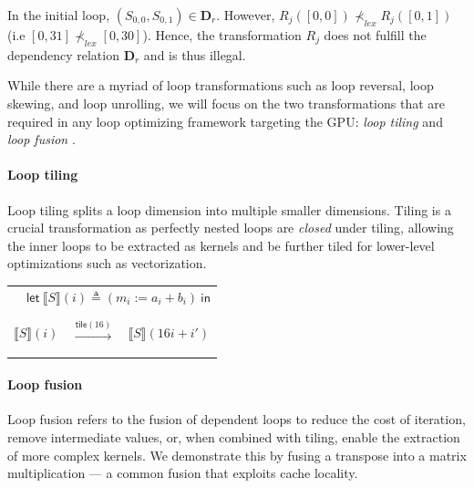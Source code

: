 \documentclass[review, acmsmall, nonacm]{acmart}
\begin{document}
In the initial loop, $(S_{0,0}, S_{0,1}) \in \mathbf{D}_r$. However, $R_j([0,0]) \not\prec_{lex} R_j([0,1])$ (i.e $[0,31] \not\prec_{lex} [0,30]$). Hence, the transformation $R_j$ does not fulfill the dependency relation $\mathbf{D}_r$ and is thus illegal.


While there are a myriad of loop transformations such as loop reversal, loop skewing, and loop unrolling, we will focus on the two transformations that are required in any loop optimizing framework targeting the GPU: \emph{loop tiling} \cite{xueTilingLoopTransformation2011,wonnacottScalabilityLoopTiling2013} and \emph{loop fusion} \cite{manjikianFusionLoopsParallelism1997, darteComplexityLoopFusion1999,qiaoLoopFusionKernel2019,mehtaRevisitingLoopFusion2014}. 

\paragraph{Loop tiling} Loop tiling splits a loop dimension into multiple smaller dimensions. Tiling is a crucial transformation as perfectly nested loops are \emph{closed} under tiling, allowing the inner loops to be extracted as kernels \cite{wonnacottScalabilityLoopTiling2013} and be further tiled for lower-level optimizations such as vectorization.

\begin{tabular}{m{}m{}m{}} \\
\multicolumn{3}{p{0.9\textwidth}}{
  $\quad \mathsf{let}~ \lBrack  S \rBrack \left(i\right) \triangleq \left( m_{i} := a_{i} + b_{i} \right) ~\mathsf{in}$ 
}
\\
\begin{algorithmic}
  \ForAll {$i \in [0,1024)$}  
      \State $\lBrack  S \rBrack (i)$
  \EndFor
\end{algorithmic}
&
$\xrightarrow{\mathsf{tile}(16)}$
&
\begin{algorithmic}
  \ForAll {$i \in [0,64)$}  
    \ForAll {$i' \in [0,16)$}  
      \State $\lBrack  S \rBrack (16i + i')$
    \EndFor
  \EndFor
\end{algorithmic}
\end{tabular}
\paragraph{Loop fusion} Loop fusion refers to the fusion of dependent loops to reduce the cost of iteration, remove intermediate values, or, when combined with tiling, enable the extraction of more complex kernels. We demonstrate this by fusing a transpose into a matrix multiplication --- a common fusion that exploits cache locality.
\end{document}
